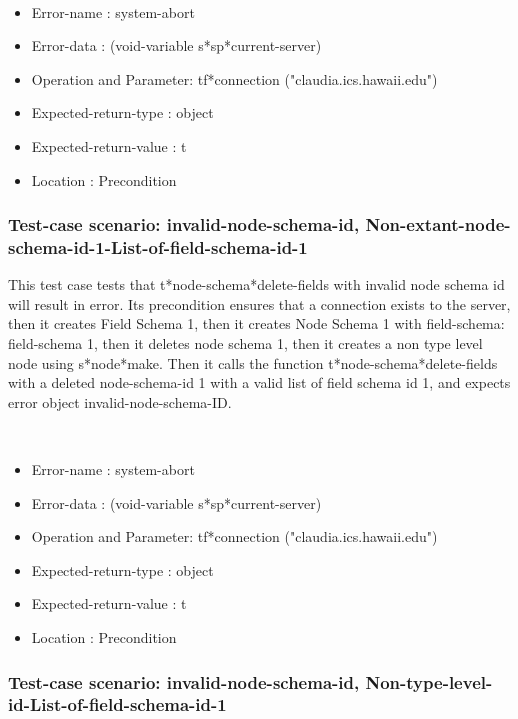 \
\begin {itemize}
\item 	Error-name             : system-abort
\item Error-data             : (void-variable s*sp*current-server)
\item Operation and Parameter: tf*connection ("claudia.ics.hawaii.edu")
\item Expected-return-type   : object
\item Expected-return-value  : t
\item Location               : Precondition



\end {itemize}
\subsubsection {Test-case scenario: invalid-node-schema-id, Non-extant-node-schema-id-1-List-of-field-schema-id-1}


This test case tests that t*node-schema*delete-fields with invalid node schema id will result in error.
Its precondition ensures that a connection exists to the server, then it creates Field Schema 1, then it creates Node Schema 1 with field-schema: field-schema 1, then it deletes node schema 1, then it creates a non type level node using s*node*make.
Then it calls the function t*node-schema*delete-fields  with a deleted node-schema-id 1 with a valid list of field schema id 1, and expects error object invalid-node-schema-ID.



\
\begin {itemize}
\item 	Error-name             : system-abort
\item Error-data             : (void-variable s*sp*current-server)
\item Operation and Parameter: tf*connection ("claudia.ics.hawaii.edu")
\item Expected-return-type   : object
\item Expected-return-value  : t
\item Location               : Precondition



\end {itemize}
\subsubsection {Test-case scenario: invalid-node-schema-id, Non-type-level-id-List-of-field-schema-id-1}



